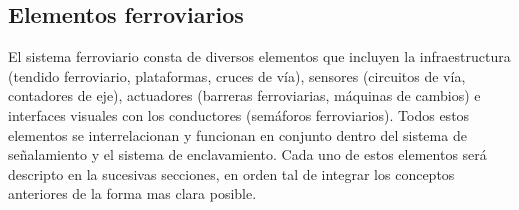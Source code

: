 \subsection{Elementos ferroviarios}

El sistema ferroviario consta de diversos elementos que incluyen la infraestructura (tendido ferroviario, plataformas, cruces de vía), sensores (circuitos de vía, contadores de eje), actuadores (barreras ferroviarias, máquinas de cambios) e interfaces visuales con los conductores (semáforos ferroviarios). Todos estos elementos se interrelacionan y funcionan en conjunto dentro del sistema de señalamiento y el sistema de enclavamiento. Cada uno de estos elementos será descripto en la sucesivas secciones, en orden tal de integrar los conceptos anteriores de la forma mas clara posible.








